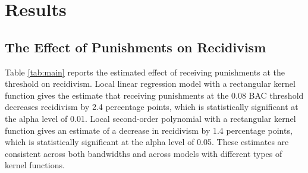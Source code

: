 \documentclass[
  11pt,
]{article}
\begin{document}
\endgroup

\hypertarget{results}{%
\section{Results}\label{results}}

\hypertarget{the-effect-of-punishments-on-recidivism}{%
\subsection{The Effect of Punishments on
Recidivism}\label{the-effect-of-punishments-on-recidivism}}

Table \ref{tab:main} reports the estimated effect of receiving
punishments at the threshold on recidivism. Local linear regression
model with a rectangular kernel function gives the estimate that
receiving punishments at the 0.08 BAC threshold decreases recidivism by
2.4 percentage points, which is statistically significant at the alpha
level of 0.01. Local second-order polynomial with a rectangular kernel
function gives an estimate of a decrease in recidivism by 1.4 percentage
points, which is statistically significant at the alpha level of 0.05.
These estimates are consistent across both bandwidths and across models
with different types of kernel functions.

\begingroup
\renewcommand{\arraystretch}{1.1}
\end{document}
